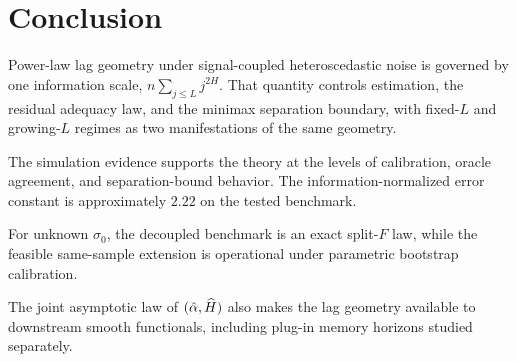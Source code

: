 \section{Conclusion}
\label{sec:conclusion}

Power-law lag geometry under signal-coupled heteroscedastic noise is governed by
one information scale, $n\sum_{j \leq L} j^{2H}$. That quantity controls
estimation, the residual adequacy law, and the minimax separation boundary, with
fixed-$L$ and growing-$L$ regimes as two manifestations of the same geometry.

The simulation evidence supports the theory at the levels of calibration,
oracle agreement, and separation-bound behavior. The information-normalized
error constant is approximately $2.22$ on the tested benchmark.

For unknown $\sigma_0$, the decoupled benchmark is an exact split-$F$ law,
while the feasible same-sample extension is operational under parametric
bootstrap calibration.

The joint asymptotic law of $(\hat\alpha,\widehat{H})$ also makes the lag geometry
available to downstream smooth functionals, including plug-in memory horizons
studied separately.
